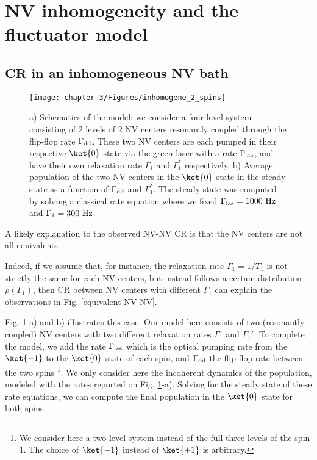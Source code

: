 \documentclass[a4paper, 11pt]{book}
\begin{document}
\section{NV inhomogeneity and the fluctuator model}

\subsection{CR in an inhomogeneous NV bath}
\begin{figure}[h]
\centering
\texttt{[image: chapter 3/Figures/inhomogene\_2\_spins]}
\caption{a) Schematics of the model: we consider a four level system consisting of 2 levels of 2 NV centers resonantly coupled through the flip-flop rate $\Gamma_{\rm dd}$. These two NV centers are each pumped in their respective $\ket{0}$ state via the green laser with a rate $\Gamma_{\rm las}$, and have their own relaxation rate $\Gamma_1$ and $\Gamma_1^*$ respectively. b) Average population of the two NV centers in the $\ket{0}$ state in the steady state as a function of $\Gamma_{\rm dd}$ and $\Gamma_1^*$. The steady state was computed by solving a classical rate equation where we fixed $\Gamma_{\rm las}=1000\ \rm Hz$ and $\Gamma_1=300\ \rm Hz$.}
\label{inhomogene}
\end{figure}
A likely explanation to the observed NV-NV CR is that the NV centers are not all equivalents.

Indeed, if we assume that, for instance, the relaxation rate $\Gamma_1=1/T_1$ is not strictly the same for each NV centers, but instead follows a certain distribution $\rho(\Gamma_1)$, then CR between NV centers with different $\Gamma_1$ can explain the observations in Fig. \ref{equivalent NV-NV}.

Fig. \ref{inhomogene}-a) and b) illustrates this case. Our model here consists of two (resonantly coupled) NV centers with two different relaxation rates $\Gamma_1$ and $\Gamma_1'$. To complete the model, we add the rate $\Gamma_{\rm las}$ which is the optical pumping rate from the $\ket{-1}$ to the $\ket{0}$ state of each spin, and $\Gamma_{\rm dd}$ the flip-flop rate between the two spins \footnote{We consider here a two level system instead of the full three levels of the spin 1. The choice of $\ket{-1}$ instead of $\ket{+1}$ is arbitrary.}. We only consider here the incoherent dynamics of the population, modeled with the rates reported on Fig. \ref{inhomogene}-a). Solving for the steady state of these rate equations, we can compute the final population in the $\ket{0}$ state for both spins. 
\end{document}
